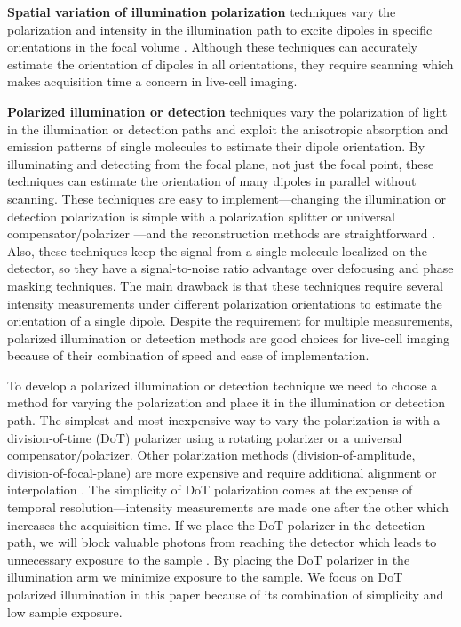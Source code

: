\documentclass[10pt]{article}
\begin{document}
\textbf{Spatial variation of illumination polarization} techniques vary the
polarization and intensity in the illumination path to excite dipoles in
specific orientations in the focal volume \cite{debarre2004}. Although these
techniques can accurately estimate the orientation of dipoles in all
orientations, they require scanning which makes acquisition time a concern in
live-cell imaging.

\textbf{Polarized illumination or detection} techniques vary the polarization of
light in the illumination or detection paths and exploit the anisotropic
absorption and emission patterns of single molecules to estimate their dipole
orientation. By illuminating and detecting from the focal plane, not just the
focal point, these techniques can estimate the orientation of many dipoles in
parallel without scanning. These techniques are easy to implement---changing the
illumination or detection polarization is simple with a polarization splitter
\cite{mehta2016} or universal compensator/polarizer \cite{shribak2003}---and the
reconstruction methods are straightforward \cite{fourkas2001, mehta2016,
  backer2016}. Also, these techniques keep the signal from a single molecule
localized on the detector, so they have a signal-to-noise ratio advantage over
defocusing and phase masking techniques. The main drawback is that these
techniques require several intensity measurements under different polarization
orientations to estimate the orientation of a single dipole. Despite the
requirement for multiple measurements, polarized illumination or detection
methods are good choices for live-cell imaging because of their combination of
speed and ease of implementation.

To develop a polarized illumination or detection technique we need to choose a
method for varying the polarization and place it in the illumination or
detection path. The simplest and most inexpensive way to vary the polarization
is with a division-of-time (DoT) polarizer using a rotating polarizer or a
universal compensator/polarizer. Other polarization methods
(division-of-amplitude, division-of-focal-plane) are more expensive and require
additional alignment or interpolation \cite{tyo2006}. The simplicity of DoT
polarization comes at the expense of temporal resolution---intensity
measurements are made one after the other which increases the acquisition
time. If we place the DoT polarizer in the detection path, we will block
valuable photons from reaching the detector which leads to unnecessary exposure
to the sample \cite{demay2011}. By placing the DoT polarizer in the illumination
arm we minimize exposure to the sample. We focus on DoT polarized illumination
in this paper because of its combination of simplicity and low sample exposure.
\end{document}

